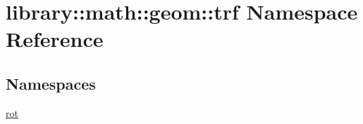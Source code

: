 \hypertarget{namespacelibrary_1_1math_1_1geom_1_1trf}{}\section{library\+:\+:math\+:\+:geom\+:\+:trf Namespace Reference}
\label{namespacelibrary_1_1math_1_1geom_1_1trf}
\subsection*{Namespaces}
\begin{DoxyCompactItemize}
\item 
 \hyperlink{namespacelibrary_1_1math_1_1geom_1_1trf_1_1rot}{rot}
\end{DoxyCompactItemize}
